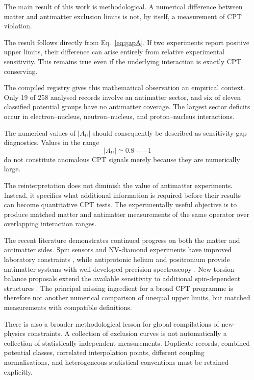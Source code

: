 \documentclass[aps,prd,reprint,superscriptaddress,nofootinbib]{revtex4-2}
\begin{document}
	The main result of this work is methodological. A numerical difference
	between matter and antimatter exclusion limits is not, by itself, a
	measurement of CPT violation.
	
	The result follows directly from Eq.~\eqref{eq:gapA}. If two experiments
	report positive upper limits, their difference can arise entirely from
	relative experimental sensitivity. This remains true even if the
	underlying interaction is exactly CPT conserving.
	
	The compiled registry gives this mathematical observation an empirical
	context. Only 19 of 258 analysed records involve an antimatter sector,
	and six of eleven classified potential groups have no antimatter
	coverage. The largest sector deficits occur in electron--nucleus,
	neutron--nucleus, and proton--nucleus interactions.
	
	The numerical values of $|A_U|$ should consequently be described as
	sensitivity-gap diagnostics. Values in the range
	\begin{equation}
		|A_U|\simeq0.8--1
	\end{equation}
	do not constitute anomalous CPT signals merely because they are
	numerically large.
	
	The reinterpretation does not diminish the value of antimatter
	experiments. Instead, it specifies what additional information is
	required before their results can become quantitative CPT tests.
	The experimentally useful objective is to produce matched matter and
	antimatter measurements of the same operator over overlapping
	interaction ranges.
	
	The recent literature demonstrates continued progress on both the
	matter and antimatter sides. Spin sensors and NV-diamond experiments
	have improved laboratory constraints \cite{Jiao2021,Liang2023,Jiang2024},
	while antiprotonic helium and positronium provide antimatter systems
	with well-developed precision spectroscopy
	\cite{Ficek2018,Adkins2022}. New torsion-balance proposals extend the
	available sensitivity to additional spin-dependent structures
	\cite{Jin2026}. The principal missing ingredient for a broad CPT
	programme is therefore not another numerical comparison of unequal
	upper limits, but matched measurements with compatible definitions.
	
	There is also a broader methodological lesson for global compilations
	of new-physics constraints. A collection of exclusion curves is not
	automatically a collection of statistically independent measurements.
	Duplicate records, combined potential classes, correlated interpolation
	points, different coupling normalisations, and heterogeneous
	statistical conventions must be retained explicitly.
	
\end{document}
